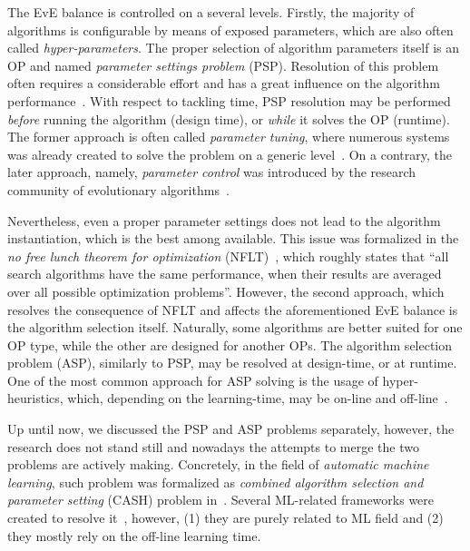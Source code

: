 The EvE balance is controlled on a several levels. Firstly, the majority of algorithms is configurable by means of exposed parameters, which are also often called \emph{hyper-parameters}. The proper selection of algorithm parameters itself is an OP and named \emph{parameter settings problem} (PSP). Resolution of this problem often requires a considerable effort and has a great influence on the algorithm performance~\cite{lavesson2006quantifying}. With respect to tackling time, PSP resolution may be performed \emph{before} running the algorithm (design time), or \emph{while} it solves the OP (runtime). The former approach is often called \emph{parameter tuning}, where numerous systems was already created to solve the problem on a generic level~\cite{hutter2009paramils,hutter2011sequential,lopez2016irace,falkner2018bohb,brise2spl}. On a contrary, the later approach, namely, \emph{parameter control} was introduced by the research community of evolutionary algorithms~\cite{karafotias2014parameter}.

Nevertheless, even a proper parameter settings does not lead to the algorithm instantiation, which is the best among available. This issue was formalized in the \emph{no free lunch theorem for optimization} (NFLT)~\cite{wolpert1997no}, which roughly states that ``all search algorithms have the same performance, when their results are averaged over all possible optimization problems''. However, the second approach, which resolves the consequence of NFLT and affects the aforementioned EvE balance is the algorithm selection itself. Naturally, some algorithms are better suited for one OP type, while the other are designed for another OPs. The algorithm selection problem (ASP), similarly to PSP, may be resolved at design-time, or at runtime. One of the most common approach for ASP solving is the usage of hyper-heuristics, which, depending on the learning-time, may be on-line and off-line~\cite{burke2019classification}. 

Up until now, we discussed the PSP and ASP problems separately, however, the research does not stand still and nowadays the attempts to merge the two problems are actively making. Concretely, in the field of \emph{automatic machine learning}, such problem was formalized as \emph{combined algorithm selection and parameter setting} (CASH) problem in~\cite{thornton2013auto}. Several ML-related frameworks were created to resolve it~\cite{thornton2013auto,feurer2015efficient,olson2019tpot}, however, (1) they are purely related to ML field and (2) they mostly rely on the off-line learning time.


